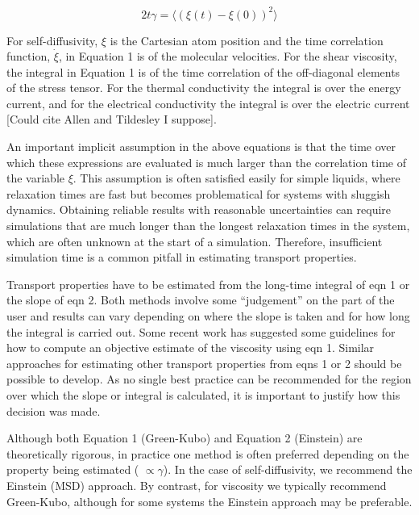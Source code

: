 \documentclass[9pt]{livecoms}
\begin{document}
\begin{equation}
2t\gamma = \langle (\xi(t)-\xi(0))^2 \rangle
\end{equation}

For self-diffusivity, $\xi$ is the Cartesian atom position and the time correlation function, $\dot{\xi}$, in Equation 1 is of the molecular velocities. For the shear viscosity, the integral in Equation 1 is of the time correlation of the off-diagonal elements of the stress tensor. For the thermal conductivity the integral is over the energy current, and for the electrical conductivity the integral is over the electric current [Could cite Allen and Tildesley I suppose].


An important implicit assumption in the above equations is that the time over which these expressions are evaluated is much larger than the correlation time of the variable $\xi$. This assumption is often satisfied easily for simple liquids, where relaxation times are fast but becomes problematical for systems with sluggish dynamics. Obtaining reliable results with reasonable uncertainties can require simulations that are much longer than the longest relaxation times in the system, which are often unknown at the start of a simulation. Therefore, insufficient simulation time is a common pitfall in estimating transport properties.

Transport properties have to be estimated from the long-time integral of eqn 1 or the slope of eqn 2. Both methods involve some “judgement” on the part of the user and results can vary depending on where the slope is taken and for how long the integral is carried out. Some recent work has suggested some guidelines for how to compute an objective estimate of the viscosity using eqn 1. Similar approaches for estimating other transport properties from eqns 1 or 2 should be possible to develop. As no single best practice can be recommended for the region over which the slope or integral is calculated, it is important to justify how this decision was made.

Although both Equation 1 (Green-Kubo) and Equation 2 (Einstein) are theoretically rigorous, in practice one method is often preferred depending on the property being estimated ( $\propto \gamma$). In the case of self-diffusivity, we recommend the Einstein (MSD) approach. By contrast, for viscosity we typically recommend Green-Kubo, although for some systems the Einstein approach may be preferable.
\end{document}

